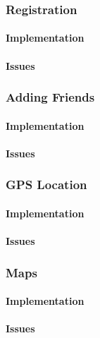 \subsubsection*{Registration}

\paragraph*{Implementation}

\paragraph*{Issues}


\subsubsection*{Adding Friends}

\paragraph*{Implementation}

\paragraph*{Issues}


\subsubsection*{GPS Location}

\paragraph*{Implementation}

\paragraph*{Issues}


\subsubsection*{Maps}

\paragraph*{Implementation}

\paragraph*{Issues}


